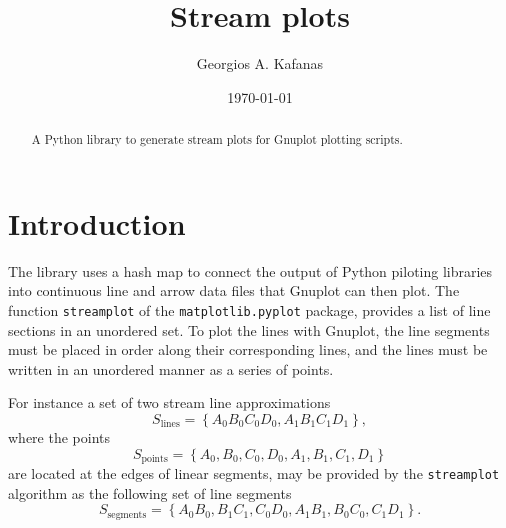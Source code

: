 \documentclass[english, a4paper]{article}
\begin{document}
\graphicspath{{Resources/Images/}{Resources/Diagrams/}}

\onehalfspacing
{}

\title{Stream plots}
\author{Georgios A. Kafanas}
\date{\today}

\maketitle

\begin{abstract}
A Python library to generate stream plots for Gnuplot plotting scripts.
\end{abstract}

\thispagestyle{empty}
\restoregeometry

\clearpage

\tableofcontents
\listoffigures
\listoftables
\listofalgorithms

\clearpage


\section{Introduction}

The library uses a hash map to connect the output of Python piloting libraries into continuous line and arrow data files that Gnuplot can then plot. The function \texttt{streamplot} of the \texttt{matplotlib.pyplot} package, provides a list of line sections in an unordered set. To plot the lines with Gnuplot, the line segments must be placed in order along their corresponding lines, and the lines must be written in an unordered manner as a series of points.

For instance a set of two stream line approximations
\begin{equation}
	S_{\mathrm{lines}} = \left\{ A_{0}B_{0}C_{0}D_{0}, A_{1}B_{1}C_{1}D_{1} \right\},
\end{equation}
where the points
\begin{equation}
	S_{\mathrm{points}} = \left\{ A_{0}, B_{0}, C_{0}, D_{0}, A_{1}, B_{1}, C_{1}, D_{1} \right\}
\end{equation}
are located at the edges of linear segments, may be provided by the \texttt{streamplot} algorithm as the following set of line segments
\begin{equation}
	S_{\mathrm{segments}} = \left\{ A_{0}B_{0}, B_{1} C_{1}, C_{0}D_{0}, A_{1}B_{1}, B_{0}C_{0}, C_{1} D_{1} \right\}.
\end{equation}
\end{document}
